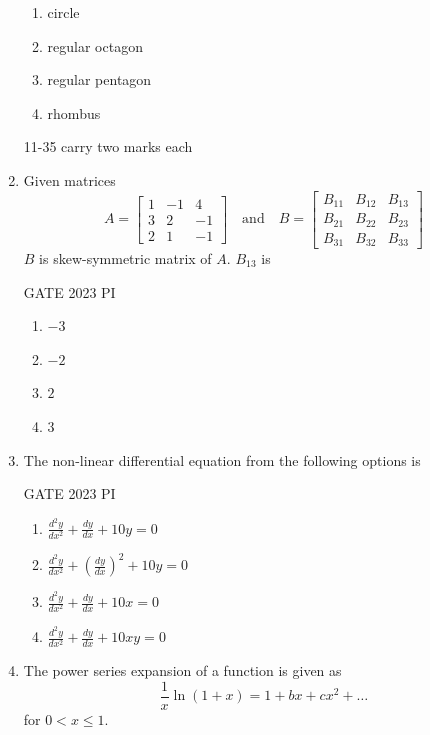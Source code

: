\documentclass[journal,12pt,onecolumn]{IEEEtran}
\theoremstyle{remark}
\begin{document}
\begin{enumerate}
\begin{multicols}{2}
\begin{enumerate}
    \item circle
    \item regular octagon
    \item regular pentagon
    \item rhombus
\end{enumerate}
\end{multicols}
11-35 carry two marks each
\item Given matrices
\[
A = \begin{bmatrix}
1 & -1 & 4 \\
3 & 2 & -1 \\
2 & 1 & -1
\end{bmatrix}
\quad \text{and} \quad
B = \begin{bmatrix}
B_{11} & B_{12} & B_{13} \\
B_{21} & B_{22} & B_{23} \\
B_{31} & B_{32} & B_{33}
\end{bmatrix}
\]
$B$ is skew-symmetric matrix of $A$. $B_{13}$ is

\hfill{GATE 2023 PI}

\begin{multicols}{2}
\begin{enumerate}
    \item $-3$
    \item $-2$
    \item $2$
    \item $3$
\end{enumerate}
\end{multicols}

\item The non-linear differential equation from the following options is

\hfill{GATE 2023 PI}

\begin{multicols}{2}
\begin{enumerate}
    \item \( \frac{d^2y}{dx^2} + \frac{dy}{dx} + 10y = 0 \)
    \item \( \frac{d^2y}{dx^2} + \left(\frac{dy}{dx}\right)^2 + 10y = 0 \)
    \item \( \frac{d^2y}{dx^2} + \frac{dy}{dx} + 10x = 0 \)
    \item \( \frac{d^2y}{dx^2} + \frac{dy}{dx} + 10xy = 0 \)
\end{enumerate}
\end{multicols}
\item The power series expansion of a function is given as
\[
\frac{1}{x}\ln(1+x) = 1 + bx + cx^2 + \ldots
\]
for \(0 < x \leq 1\).


\end{enumerate}
\end{document}
